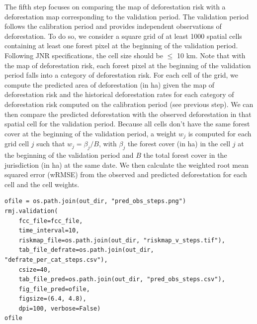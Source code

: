 \documentclass[paper=a4, 12pt, DIV=12]{scrartcl}
\begin{document}
The fifth step focuses on comparing the map of deforestation risk with a deforestation map corresponding to the validation period. The validation period follows the calibration period and provides independent observations of deforestation. To do so, we consider a square grid of at least 1000 spatial cells containing at least one forest pixel at the beginning of the validation period. Following JNR specifications, the cell size should be \(\leq\) 10 km. Note that with the map of deforestation risk, each forest pixel at the beginning of the validation period falls into a category of deforestation risk. For each cell of the grid, we compute the predicted area of deforestation (in ha) given the map of deforestation risk and the historical deforestation rates for each category of deforestation risk computed on the calibration period (see previous step). We can then compare the predicted deforestation with the observed deforestation in that spatial cell for the validation period. Because all cells don't have the same forest cover at the beginning of the validation period, a weight \(w_j\) is computed for each grid cell \(j\) such that \(w_j=\beta_j / B\), with \(\beta_j\) the forest cover (in ha) in the cell \(j\) at the beginning of the validation period and \(B\) the total forest cover in the jurisdiction (in ha) at the same date. We then calculate the weighted root mean squared error (wRMSE) from the observed and predicted deforestation for each cell and the cell weights.

\begin{verbatim}
ofile = os.path.join(out_dir, "pred_obs_steps.png")
rmj.validation(
    fcc_file=fcc_file,
    time_interval=10,
    riskmap_file=os.path.join(out_dir, "riskmap_v_steps.tif"),
    tab_file_defrate=os.path.join(out_dir, "defrate_per_cat_steps.csv"),
    csize=40,
    tab_file_pred=os.path.join(out_dir, "pred_obs_steps.csv"),
    fig_file_pred=ofile,
    figsize=(6.4, 4.8),
    dpi=100, verbose=False)
ofile
\end{verbatim}
\end{document}
